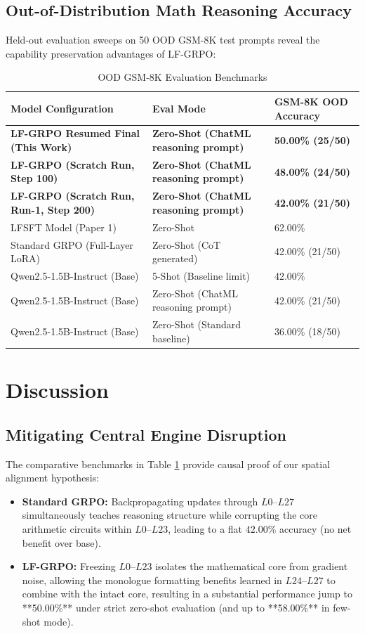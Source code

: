 \documentclass[11pt]{article}
\begin{document}
\subsection{Out-of-Distribution Math Reasoning Accuracy}

Held-out evaluation sweeps on 50 OOD GSM-8K test prompts reveal the capability preservation advantages of LF-GRPO:

\begin{table}[h]
\centering
\caption{OOD GSM-8K Evaluation Benchmarks}
\label{tab:ood_results}
\begin{tabular}{lll}
\toprule
\textbf{Model Configuration} & \textbf{Eval Mode} & \textbf{GSM-8K OOD Accuracy} \\
\midrule
\textbf{LF-GRPO Resumed Final (This Work)} & \textbf{Zero-Shot (ChatML reasoning prompt)} & \textbf{50.00\% (25/50)} \\
\textbf{LF-GRPO (Scratch Run, Step 100)} & \textbf{Zero-Shot (ChatML reasoning prompt)} & \textbf{48.00\% (24/50)} \\
\textbf{LF-GRPO (Scratch Run, Run-1, Step 200)} & \textbf{Zero-Shot (ChatML reasoning prompt)} & \textbf{42.00\% (21/50)} \\
LFSFT Model (Paper 1) & Zero-Shot & 62.00\% \\
Standard GRPO (Full-Layer LoRA) & Zero-Shot (CoT generated) & 42.00\% (21/50) \\
Qwen2.5-1.5B-Instruct (Base) & 5-Shot (Baseline limit) & 42.00\% \\
Qwen2.5-1.5B-Instruct (Base) & Zero-Shot (ChatML reasoning prompt) & 42.00\% (21/50) \\
Qwen2.5-1.5B-Instruct (Base) & Zero-Shot (Standard baseline) & 36.00\% (18/50) \\
\bottomrule
\end{tabular}
\end{table}

\section{Discussion}

\subsection{Mitigating Central Engine Disruption}

The comparative benchmarks in Table \ref{tab:ood_results} provide causal proof of our spatial alignment hypothesis:
\begin{itemize}
    \item \textbf{Standard GRPO:} Backpropagating updates through $L0$--$L27$ simultaneously teaches reasoning structure while corrupting the core arithmetic circuits within $L0$--$L23$, leading to a flat $42.00\%$ accuracy (no net benefit over base).
    \item \textbf{LF-GRPO:} Freezing $L0$--$L23$ isolates the mathematical core from gradient noise, allowing the monologue formatting benefits learned in $L24$--$L27$ to combine with the intact core, resulting in a substantial performance jump to **50.00\%** under strict zero-shot evaluation (and up to **58.00\%** in few-shot mode).
\end{itemize}
\end{document}
